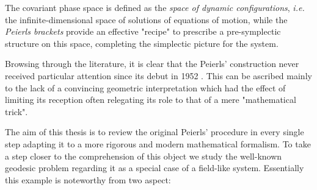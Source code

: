 \documentclass[Main]{subfiles}
\begin{document}
The covariant phase space is defined as the \emph{space of dynamic configurations}, \textit{i.e.}  the infinite-dimensional space of solutions of equations of motion, while the \emph{Peierls brackets} provide an effective "recipe" to prescribe a pre-symplectic structure on this space, completing the simplectic picture for the system.

Browsing through the literature, it is clear that the Peierls' construction never received particular attention since its debut in 1952 \cite{Peierls1952}.
This can be ascribed mainly to the lack of a convincing geometric interpretation
which had the effect of limiting its reception often relegating its role to that of a mere  "mathematical trick".

The aim of this thesis is to review the original Peierls' procedure in every single step adapting it to a more rigorous and modern mathematical formalism.
To take a step closer to the comprehension of this object we study the well-known geodesic problem regarding it as a special case of a field-like system.
Essentially this example is noteworthy from two aspect:
\end{document}
